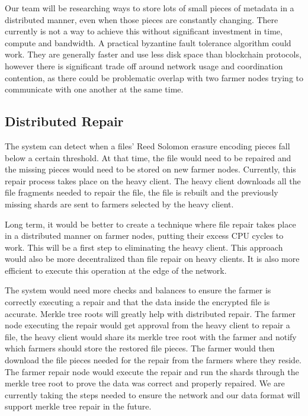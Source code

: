 \documentclass[a4paper,10pt]{article} \usepackage[utf8]{inputenc}
\begin{document}
Our team will be researching ways to store lots of small pieces of metadata 
in a distributed manner, even when those pieces are constantly changing. There 
currently is not a way to achieve this without significant investment in time, 
compute and bandwidth. A practical byzantine fault tolerance algorithm could 
work. They are generally faster and use less disk space than blockchain protocols, 
however there is significant trade off around network usage and coordination 
contention, as there could be problematic overlap with two farmer nodes trying 
to communicate with one another at the same time. 


\subsection{Distributed Repair}
The system can detect when a files’ Reed Solomon erasure encoding pieces fall below a 
certain threshold. At that time, the file would need to be repaired and the missing pieces 
would need to be stored on new farmer nodes. Currently, this repair process takes place on 
the heavy client. The heavy client downloads all the file fragments needed to repair the 
file, the file is rebuilt and the previously missing shards are sent to farmers selected by
the heavy client. 

Long term, it would be better to create a technique where file repair takes place in a 
distributed manner on farmer nodes, putting their excess CPU cycles to work. This will 
be a first step to eliminating the heavy client. This approach would also be more 
decentralized than file repair on heavy clients. It is also more efficient to execute 
this operation at the edge of the network. 

The system would need more checks and balances to ensure the farmer is correctly executing
a repair and that the data inside the encrypted file is accurate. Merkle tree roots will 
greatly help with distributed repair. The farmer node executing the repair would get approval 
from the heavy client to repair a file, the heavy client would share its merkle tree root 
with the farmer and notify which farmers should store the restored file pieces. The farmer 
would then download the file pieces needed for the repair from the farmers where they reside. 
The farmer repair node would execute the repair and run the shards through the merkle tree 
root to prove the data was correct and properly repaired. We are currently taking the steps 
needed to ensure the network and our data format will support merkle tree repair in the future. 
\end{document}
